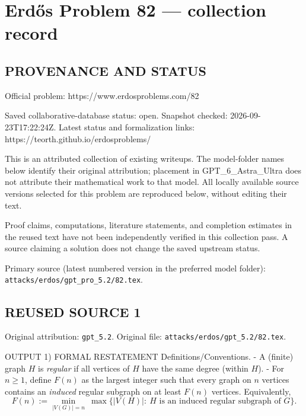 \section*{Erd\H{o}s Problem 82 --- collection record}

\subsection*{PROVENANCE AND STATUS}
Official problem: https://www.erdosproblems.com/82

Saved collaborative-database status: open.
Snapshot checked: 2026-09-23T17:22:24Z.
Latest status and formalization links: https://teorth.github.io/erdosproblems/

This is an attributed collection of existing writeups. The model-folder names below identify their original attribution; placement in GPT\_6\_Astra\_Ultra does not attribute their mathematical work to that model. All locally available source versions selected for this problem are reproduced below, without editing their text.

Proof claims, computations, literature statements, and completion estimates in the reused text have not been independently verified in this collection pass. A source claiming a solution does not change the saved upstream status.

Primary source (latest numbered version in the preferred model folder): \texttt{attacks/erdos/gpt\_pro\_5.2/82.tex}.

\subsection*{REUSED SOURCE 1}
Original attribution: \texttt{gpt\_5.2}.
Original file: \texttt{attacks/erdos/gpt\_5.2/82.tex}.


OUTPUT
1) FORMAL RESTATEMENT
Definitions/Conventions.
- A (finite) graph $H$ is \emph{regular} if all vertices of $H$ have the same degree (within $H$).
- For $n\ge 1$, define $F(n)$ as the largest integer such that every graph on $n$ vertices contains an \emph{induced} regular subgraph on at least $F(n)$ vertices.
Equivalently,
\[F(n):=\min_{|V(G)|=n}\ \max\{|V(H)|:\ H \text{ is an induced regular subgraph of }G\}.\]

